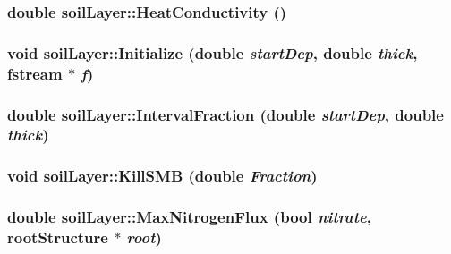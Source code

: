 \label{classsoil_layer_aea32d315c53d868d637078ca9a3c5cd9}
\hypertarget{classsoil_layer_a68f3bd7b3e269ba3592e6fd5f04ba9e3}{
\subsubsection[{HeatConductivity}]{\setlength{\rightskip}{0pt plus 5cm}double soilLayer::HeatConductivity ()}}
\label{classsoil_layer_a68f3bd7b3e269ba3592e6fd5f04ba9e3}
\hypertarget{classsoil_layer_a9408711ac2943d5aff72bf3fc0e9e7c7}{
\subsubsection[{Initialize}]{\setlength{\rightskip}{0pt plus 5cm}void soilLayer::Initialize (double {\em startDep}, \/  double {\em thick}, \/  fstream $\ast$ {\em f})}}
\label{classsoil_layer_a9408711ac2943d5aff72bf3fc0e9e7c7}
\hypertarget{classsoil_layer_affa95354eeb271651824f92af6b24ca6}{
\subsubsection[{IntervalFraction}]{\setlength{\rightskip}{0pt plus 5cm}double soilLayer::IntervalFraction (double {\em startDep}, \/  double {\em thick})}}
\label{classsoil_layer_affa95354eeb271651824f92af6b24ca6}
\hypertarget{classsoil_layer_ae48e99b10956f43841d25f5402be1c30}{
\subsubsection[{KillSMB}]{\setlength{\rightskip}{0pt plus 5cm}void soilLayer::KillSMB (double {\em Fraction})}}
\label{classsoil_layer_ae48e99b10956f43841d25f5402be1c30}
\hypertarget{classsoil_layer_a8d2a6031dcc56ae0c290a9503c192963}{
\subsubsection[{MaxNitrogenFlux}]{\setlength{\rightskip}{0pt plus 5cm}double soilLayer::MaxNitrogenFlux (bool {\em nitrate}, \/  {\bf rootStructure} $\ast$ {\em root})}}
